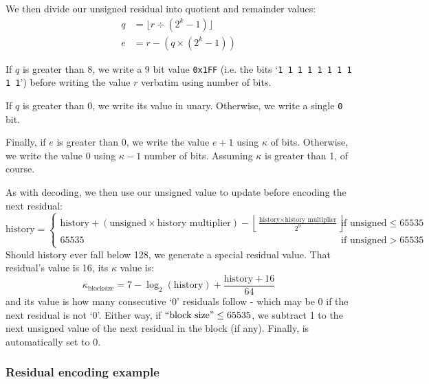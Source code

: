 We then divide our unsigned residual into quotient and remainder values:
\begin{align*}
q &= \lfloor r \div (2^k - 1) \rfloor \\
e &= r - (q \times (2^k - 1))
\end{align*}

If $q$ is greater than 8, we write a 9 bit value \texttt{0x1FF}
(i.e. the bits `\texttt{1 1 1 1 1 1 1 1 1 1}')
before writing the value $r$ verbatim using 
number of bits.

If $q$ is greater than 0, we write its value in unary.
Otherwise, we write a single \texttt{0} bit.

Finally, if $e$ is greater than 0, we write the value
$e + 1$ using $\kappa$ of bits.
Otherwise, we write the value 0 using $\kappa - 1$ number of bits.
Assuming $\kappa$ is greater than 1, of course.

\clearpage

As with decoding, we then use our unsigned value to update 
before encoding the next residual:
{
\begin{equation*}
\text{history} =
\begin{cases}
\text{history} + (\text{unsigned} \times \text{history multiplier}) - \left\lfloor\frac{\text{history} \times \text{history multiplier}}{2^9}\right\rfloor & \text{if unsigned} \leq 65535 \\
65535 & \text{if unsigned} > 65535
\end{cases}
\end{equation*}
}
Should history ever fall below 128, we generate a special
residual value.
That residual's  value is 16, its
$\kappa$ value is:
\begin{equation}
\kappa_{\text{blocksize}} = 7 - \log_2(\text{history}) + \frac{\text{history} + 16}{64}
\end{equation}
and its value is how many consecutive `0' residuals follow -
which may be 0 if the next residual is not `0'.
Either way, if $\text{``{block size}''} \leq 65535$, we
subtract 1 to the next unsigned value of the next residual in the block
(if any).  Finally,  is automatically set to 0.

\subsubsection{Residual encoding example}

